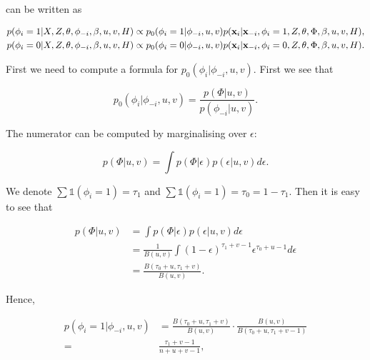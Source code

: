 \documentclass[12pt,english]{article}\usepackage[]{graphicx}\usepackage[]{color}
\begin{document}
can be written as

\begin{equation}
\begin{split}
p(\phi_i = 1|X,Z,\theta, \phi_{-i}, \beta, u,v, H) &\propto p_0(\phi_i = 1|\phi_{-i},u,v)p({\bf x}_i|{\bf x}_{-i},\phi_i =1,Z,\theta, \Phi, \beta, u,v, H), \\
p(\phi_i = 0|X,Z,\theta,\phi_{-i}, \beta, u,v, H) &\propto p_0(\phi_i = 0|\phi_{-i},u,v)p({\bf x}_i|{\bf x}_{-i},\phi_i=0,Z,\theta, \Phi, \beta, u,v, H). \\
\end{split}
\end{equation}

First we need to compute a formula for
$p_0(\phi_i|\phi_{-i},u,v)$. First we see that

\begin{equation}
p_0(\phi_i|\phi_{-i},u,v) = \frac{p(\Phi|u,v)}{p(\phi_{-i}|u,v)}.
\end{equation}

The numerator can be computed by marginalising over $\epsilon$:

\begin{equation}
p(\Phi|u,v) = \int p(\Phi | \epsilon)p(\epsilon|u,v) d\epsilon.
\end{equation}

We denote $\sum\mathds{1}(\phi_i = 1) = \tau_1$ and
$\sum\mathds{1}(\phi_i = 1) = \tau_0 = 1 -\tau_1$. Then it is easy to
see that

\begin{equation}
\begin{split}
p(\Phi|u,v) & = \int p(\Phi | \epsilon)p(\epsilon|u,v) d\epsilon\\
& = \frac{1}{B(u,v)}\int (1-\epsilon)^{\tau_1 + v - 1}\epsilon^{\tau_0 + u - 1} d\epsilon\\
& = \frac{B(\tau_0 + u,\tau_1 + v)}{B(u,v)}.
\end{split}
\end{equation}

Hence,

\begin{equation}
\begin{split}
p(\phi_i=1|\phi_{-i},u,v) &= \frac{B(\tau_0 + u,\tau_1 + v)}{B(u,v)} \cdot \frac{B(u,v)}{B(\tau_0 + u,\tau_1 + v -1)}\\
= & \frac{\tau_1 + v - 1}{n+u+v-1},
\end{split}
\end{equation}
\end{document}

